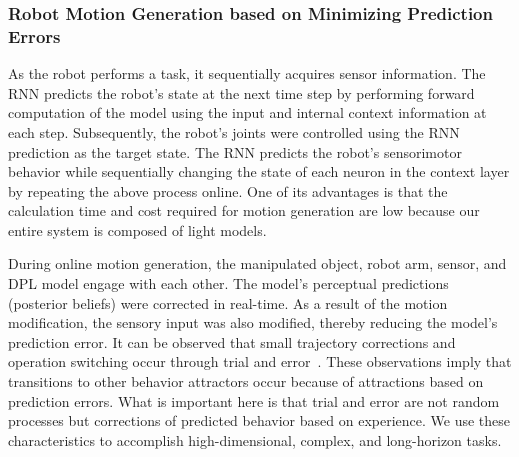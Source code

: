 \subsubsection{Robot Motion Generation based on Minimizing Prediction Errors}
\label{sec_generation}

As the robot performs a task, it sequentially acquires sensor information. The RNN predicts the robot's state at the next time step by performing forward computation of the model using the input and internal context information at each step. Subsequently, the robot's joints were controlled using the RNN prediction as the target state. The RNN predicts the robot's sensorimotor behavior while sequentially changing the state of each neuron in the context layer by repeating the above process online. One of its advantages is that the calculation time and cost required for motion generation are low because our entire system is composed of light models.


During online motion generation, the manipulated object, robot arm, sensor, and DPL model engage with each other. The model's perceptual predictions (posterior beliefs) were corrected in real-time. As a result of the motion modification, the sensory input was also modified, thereby reducing the model's prediction error. It can be observed that small trajectory corrections and operation switching occur through trial and error~\cite{Ichiwara2022contact,Koma2016ral}. These observations imply that transitions to other behavior attractors occur because of attractions based on prediction errors. What is important here is that trial and error are not random processes but corrections of predicted behavior based on experience. We use these characteristics to accomplish high-dimensional, complex, and long-horizon tasks.


